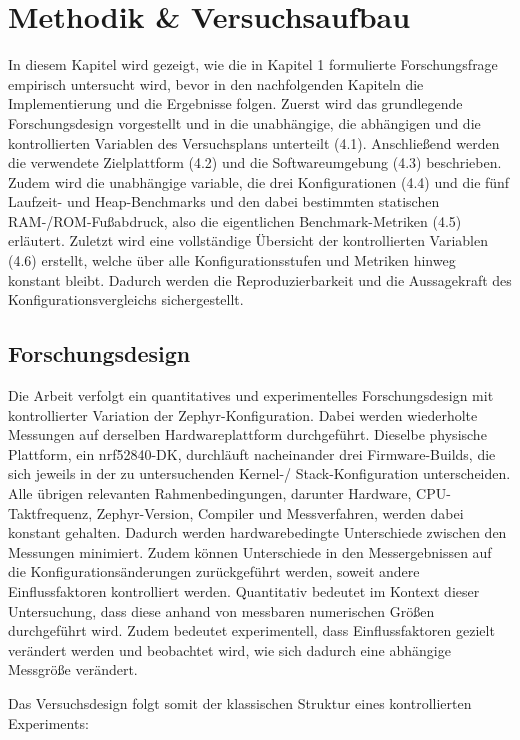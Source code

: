 \chapter{Methodik \& Versuchsaufbau}
In diesem Kapitel wird gezeigt, wie die in Kapitel 1 formulierte Forschungsfrage empirisch untersucht wird, bevor in den nachfolgenden Kapiteln die Implementierung und die Ergebnisse folgen. Zuerst wird das grundlegende Forschungsdesign vorgestellt und in die unabhängige, die abhängigen und die kontrollierten Variablen des Versuchsplans unterteilt (4.1). Anschließend werden die verwendete Zielplattform (4.2) und die Softwareumgebung (4.3) beschrieben. Zudem wird die unabhängige variable, die drei Konfigurationen (4.4) und die fünf Laufzeit- und Heap-Benchmarks und den dabei bestimmten statischen RAM-/ROM-Fußabdruck, also die eigentlichen Benchmark-Metriken (4.5) erläutert. Zuletzt wird eine vollständige Übersicht der kontrollierten Variablen (4.6) erstellt, welche über alle Konfigurationsstufen und Metriken hinweg konstant bleibt. Dadurch werden die Reproduzierbarkeit und die Aussagekraft des Konfigurationsvergleichs sichergestellt.

\section{Forschungsdesign}
Die Arbeit verfolgt ein quantitatives und experimentelles Forschungsdesign mit kontrollierter Variation der Zephyr-Konfiguration. Dabei werden wiederholte Messungen auf derselben Hardwareplattform durchgeführt. Dieselbe physische Plattform, ein nrf52840-DK, durchläuft nacheinander drei Firmware-Builds, die sich jeweils in der zu untersuchenden Kernel-/ Stack-Konfiguration unterscheiden. Alle übrigen relevanten Rahmenbedingungen, darunter Hardware, CPU-Taktfrequenz, Zephyr-Version, Compiler und Messverfahren, werden dabei konstant gehalten. Dadurch werden hardwarebedingte Unterschiede zwischen den Messungen minimiert. Zudem können Unterschiede in den Messergebnissen auf die Konfigurationsänderungen zurückgeführt werden, soweit andere Einflussfaktoren kontrolliert werden. Quantitativ bedeutet im Kontext dieser Untersuchung, dass diese anhand von messbaren numerischen Größen durchgeführt wird. Zudem bedeutet experimentell, dass Einflussfaktoren gezielt verändert werden und beobachtet wird, wie sich dadurch eine abhängige Messgröße verändert.

Das Versuchsdesign folgt somit der klassischen Struktur eines kontrollierten Experiments:

